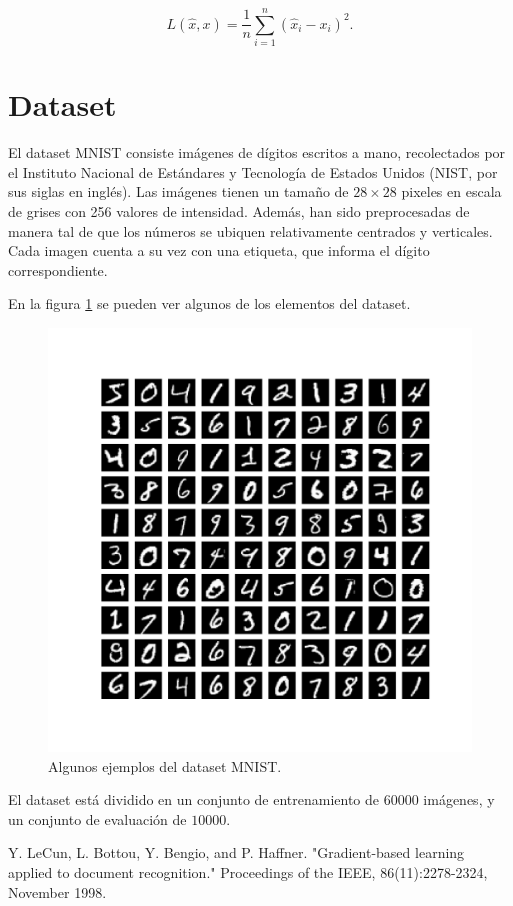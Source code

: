 \documentclass[10pt,twocolumn]{article}
\begin{document}
\begin{equation}
L(\hat{x}, x) = \dfrac{1}{n} \sum_{i=1}^n (\hat{x}_i - x_i)^2.
\end{equation}

\section{Dataset}

El dataset MNIST \cite{LeCun} consiste imágenes de dígitos escritos a mano, recolectados por el Instituto Nacional de Estándares y Tecnología de Estados Unidos (NIST, por sus siglas en inglés). Las imágenes tienen un tamaño de $28\times28$ pixeles en escala de grises con 256 valores de intensidad. Además, han sido preprocesadas de manera tal de que los números se ubiquen relativamente centrados y verticales. Cada imagen cuenta a su vez con una etiqueta, que informa el dígito correspondiente. 

En la figura \ref{fig:ejemplos} se pueden ver algunos de los elementos del dataset.


\begin{figure}[th]
\centering
\includegraphics[scale=0.45]{ejemplos.pdf}
\caption{\label{fig:ejemplos} Algunos ejemplos del dataset MNIST.}
\end{figure}

El dataset está dividido en un conjunto de entrenamiento de $60000$ imágenes, y un conjunto de evaluación de $10000$. 



\begin{thebibliography}{9}
Y. LeCun, L. Bottou, Y. Bengio, and P. Haffner. "Gradient-based learning applied to document recognition." Proceedings of the IEEE, 86(11):2278-2324, November 1998.
\end{thebibliography}
\end{document}
